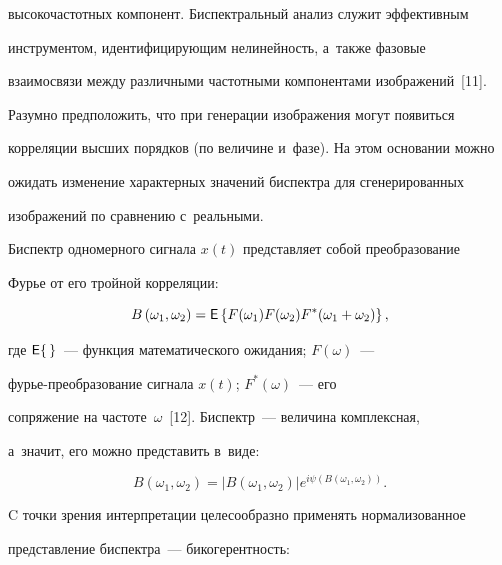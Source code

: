 высокочастотных компонент. Биспектральный анализ служит эффективным 


инструментом, идентифицирующим не\-ли\-ней\-ность, а~также фазовые 


взаимосвязи между различными частотными компонентами изображений~[11]. 


Разумно предположить, что при генерации изображения могут появиться 


корреляции высших порядков (по величине и~фазе). На этом основании можно 


ожидать изменение характерных значений би\-спект\-ра для сгенерированных 


изображений по сравнению с~реальными.


  


  Биспектр одномерного сигнала $x(t)$ пред\-став\-ля\-ет собой преобразование 


\mbox{Фурье} от его тройной корреляции: 


  \begin{equation*}


  B\left( \omega_1,\omega_2\right) ={\sf E}\left\{ F(\omega_1) F(\omega_2) 


F^*(\omega_1+\omega_2)\right\},




  \end{equation*}


где ${\sf E}\{\,\}$~--- функция математического ожидания; $F(\omega)$~---  


фурье-пре\-об\-ра\-зо\-ва\-ние сигнала $x(t)$; $F^*(\omega)$~--- его 


сопряжение на частоте~$\omega$~[12]. Биспектр~--- величина комплексная, 


а~значит, его можно представить в~виде:


\begin{equation*}


B\left( \omega_1,\omega_2\right) =\left\vert B(\omega_1,\omega_2)\right\vert  


e^{i \psi (B(\omega_1,\omega_2))}.




\end{equation*}


  


  C точки зрения интерпретации целесообразно применять нормализованное 


пред\-став\-ле\-ние би\-спект\-ра~--- би\-ко\-ге\-рент\-ность:



